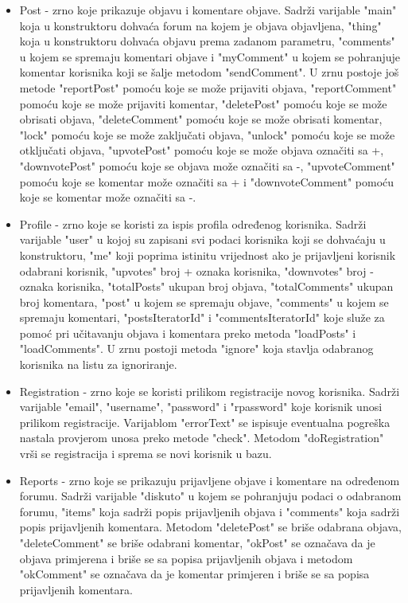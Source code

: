 \documentclass{foi}
\begin{document}
\begin{itemize}
\begin{itemize}
	\item Post - zrno koje prikazuje objavu i komentare objave. Sadrži varijable "main" koja u konstruktoru dohvaća forum na kojem je objava objavljena, "thing" koja u konstruktoru dohvaća objavu prema zadanom parametru, "comments" u kojem se spremaju komentari objave i "myComment" u kojem se pohranjuje komentar korisnika koji se šalje metodom "sendComment". U zrnu postoje još metode "reportPost" pomoću koje se može prijaviti objava, "reportComment" pomoću koje se može prijaviti komentar, "deletePost" pomoću koje se može obrisati objava, "deleteComment" pomoću koje se može obrisati komentar, "lock" pomoću koje se može zaključati objava, "unlock" pomoću koje se može otključati objava, "upvotePost" pomoću koje se može objava označiti sa +, "downvotePost" pomoću koje se objava može označiti sa -, "upvoteComment" pomoću koje se komentar može označiti sa + i "downvoteComment" pomoću koje se komentar može označiti sa -.
	\item Profile - zrno koje se koristi za ispis profila određenog korisnika. Sadrži varijable "user" u kojoj su zapisani svi podaci korisnika koji se dohvaćaju u konstruktoru, "me" koji poprima istinitu vrijednost ako je prijavljeni korisnik odabrani korisnik, "upvotes" broj + oznaka korisnika, "downvotes" broj - oznaka korisnika, "totalPosts" ukupan broj objava, "totalComments" ukupan broj komentara, "post" u kojem se spremaju objave, "comments" u kojem se spremaju komentari, "postsIteratorId" i "commentsIteratorId" koje služe za pomoć pri učitavanju objava i komentara preko metoda "loadPosts" i "loadComments". U zrnu postoji metoda "ignore" koja stavlja odabranog korisnika na listu za ignoriranje.
	\item Registration - zrno koje se koristi prilikom registracije novog korisnika. Sadrži varijable "email", "username", "password" i "rpassword" koje korisnik unosi prilikom registracije. Varijablom "errorText" se ispisuje eventualna pogreška nastala provjerom unosa preko metode "check". Metodom "doRegistration" vrši se registracija i sprema se novi korisnik u bazu.
	\item Reports - zrno koje se prikazuju prijavljene objave i komentare na određenom forumu. Sadrži varijable "diskuto" u kojem se pohranjuju podaci o odabranom forumu, "items" koja sadrži popis prijavljenih objava i "comments" koja sadrži popis prijavljenih komentara. Metodom "deletePost" se briše odabrana objava, "deleteComment" se briše odabrani komentar, "okPost" se označava da je objava primjerena i briše se sa popisa prijavljenih objava i metodom "okComment" se označava da je komentar primjeren i briše se sa popisa prijavljenih komentara.

\end{itemize}
\end{itemize}
\end{document}

